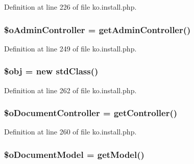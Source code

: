Definition at line 226 of file ko.\+install.\+php.

\hypertarget{ko_8install_8php_a52d90466dc7adee7d324b3ef032b8167}{}
\subsubsection[{\$o\+Admin\+Controller}]{\setlength{\rightskip}{0pt plus 5cm}\$o\+Admin\+Controller = {\bf get\+Admin\+Controller}(\textquotesingle{})}\label{ko_8install_8php_a52d90466dc7adee7d324b3ef032b8167}


Definition at line 249 of file ko.\+install.\+php.

\hypertarget{ko_8install_8php_a9008ed94ba185855b1723e367744b87e}{}
\subsubsection[{\$obj}]{\setlength{\rightskip}{0pt plus 5cm}\$obj = new std\+Class()}\label{ko_8install_8php_a9008ed94ba185855b1723e367744b87e}


Definition at line 262 of file ko.\+install.\+php.

\hypertarget{ko_8install_8php_aac43fce682d4b7a05df6d3e44c2c54e6}{}
\subsubsection[{\$o\+Document\+Controller}]{\setlength{\rightskip}{0pt plus 5cm}\$o\+Document\+Controller = {\bf get\+Controller}(\textquotesingle{})}\label{ko_8install_8php_aac43fce682d4b7a05df6d3e44c2c54e6}


Definition at line 260 of file ko.\+install.\+php.

\hypertarget{ko_8install_8php_afb18aa87e5520385e76377e876e042af}{}
\subsubsection[{\$o\+Document\+Model}]{\setlength{\rightskip}{0pt plus 5cm}\$o\+Document\+Model = {\bf get\+Model}(\textquotesingle{})}\label{ko_8install_8php_afb18aa87e5520385e76377e876e042af}


